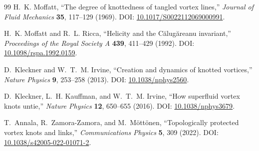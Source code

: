 \begin{thebibliography}{99}
H.~K. Moffatt,
``The degree of knottedness of tangled vortex lines,''
\emph{Journal of Fluid Mechanics} \textbf{35}, 117--129 (1969).
DOI: \href{https://doi.org/10.1017/S0022112069000991}{10.1017/S0022112069000991}.

H.~K. Moffatt and R.~L. Ricca,
``Helicity and the C\u{a}lug\u{a}reanu invariant,''
\emph{Proceedings of the Royal Society A} \textbf{439}, 411--429 (1992).
DOI: \href{https://doi.org/10.1098/rspa.1992.0159}{10.1098/rspa.1992.0159}.

D.~Kleckner and W.~T.~M. Irvine,
``Creation and dynamics of knotted vortices,''
\emph{Nature Physics} \textbf{9}, 253--258 (2013).
DOI: \href{https://doi.org/10.1038/nphys2560}{10.1038/nphys2560}.

D.~Kleckner, L.~H. Kauffman, and W.~T.~M. Irvine,
``How superfluid vortex knots untie,''
\emph{Nature Physics} \textbf{12}, 650--655 (2016).
DOI: \href{https://doi.org/10.1038/nphys3679}{10.1038/nphys3679}.

T.~Annala, R.~Zamora-Zamora, and M.~M\"ott\"onen,
``Topologically protected vortex knots and links,''
\emph{Communications Physics} \textbf{5}, 309 (2022).
DOI: \href{https://doi.org/10.1038/s42005-022-01071-2}{10.1038/s42005-022-01071-2}.
\end{thebibliography}
